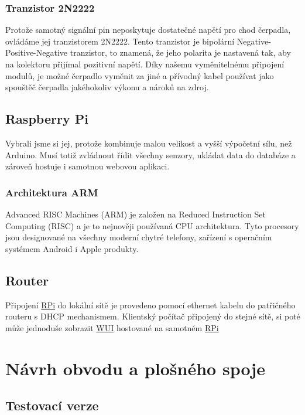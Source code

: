 \documentclass[czech,12pt,a4paper]{article}
\begin{document}
\subsubsection{Tranzistor 2N2222}

Protože samotný signální pin neposkytuje dostatečné napětí pro chod čerpadla, ovládáme jej tranzistorem 2N2222. Tento tranzistor je bipolární Negative-Positive-Negative tranzistor, to znamená, že jeho polarita je nastavená tak, aby na kolektoru přijímal pozitivní napětí. Díky našemu vyměnitelnému připojení modulů, je možné čerpadlo vyměnit za jiné a přívodný kabel používat jako spouštěč čerpadla jakéhokoliv výkonu a nároků na zdroj.

\subsection{Raspberry Pi}

Vybrali jsme si jej, protože kombinuje malou velikost a vyšší výpočetní sílu, než Arduino. Musí totiž zvládnout řídit všechny senzory, ukládat data do databáze a zároveň hostuje i samotnou webovou aplikaci.

\subsubsection{Architektura ARM}

Advanced RISC Machines (ARM) je založen na Reduced Instruction Set Computing (RISC) a je to nejnověji používaná CPU architektura. Tyto procesory jsou designované na všechny moderní chytré telefony, zařízení s operačním systémem Android i Apple produkty.

\subsection{Router}

Připojení \underline{\ac{RPi}} do lokální sítě je provedeno pomocí ethernet kabelu do patřičného routeru s \ac{DHCP} mechanismem. Klientský počítač připojený do stejné sítě, si poté může jednoduše zobrazit \underline{\ac{WUI}} hostované na samotném \underline{\ac{RPi}}

\section{Návrh obvodu a plošného spoje}

\subsection{Testovací verze}
\end{document}
